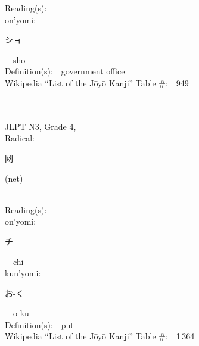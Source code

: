 \begin{multicols}{2}
Reading(s):\ \ \\
{\hspace*{1em}}on'yomi:\ \ \\
{\hspace*{2em}}{\begin{CJK}{UTF8}{min} ショ \end{CJK}}\ \ sho\ \ \\
Definition(s):\ \ government office \\
Wikipedia ``List of the J\=oy\=o Kanji'' Table \#:\ \ 949 \\
\ \ \\
{\fontsize{34pt}{40pt}  }\ \ \\  %
{JLPT N3, Grade 4, \\Radical:\ \ {\begin{CJK}{UTF8}{min} 网 \end{CJK}} (net) } \\
Reading(s):\ \ \\
{\hspace*{1em}}on'yomi:\ \ \\
{\hspace*{2em}}{\begin{CJK}{UTF8}{min} チ \end{CJK}}\ \ chi\ \ \\
{\hspace*{1em}}kun'yomi:\ \ \\
{\hspace*{2em}}{\begin{CJK}{UTF8}{min} お-く \end{CJK}}\ \ o-ku\ \ \\
Definition(s):\ \ put \\
Wikipedia ``List of the J\=oy\=o Kanji'' Table \#:\ \ 1\,364 \\
\ \ \\
\end{multicols}



